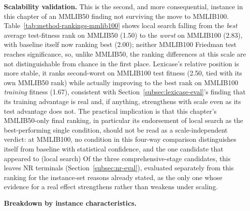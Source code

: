 \textbf{Scalability validation.} This is the second, and more consequential,
instance in this chapter of an MMLIB50 finding not surviving the move to
MMLIB100. Table~\ref{tab:method-rankings-mmlib100} shows local search
falling from the \emph{best} average test-fitness rank on MMLIB50 (1.50) to
the \emph{worst} on MMLIB100 (2.83), with baseline itself now ranking best
(2.00); neither MMLIB100 Friedman test reaches significance, so, unlike
MMLIB50, the ranking differences at this scale are not distinguishable from
chance in the first place. Lexicase's relative position is more stable, it
ranks second-worst on MMLIB100 test fitness (2.50, tied with its own
MMLIB50 rank) while actually improving to the best rank on MMLIB100
\emph{training} fitness (1.67), consistent with
Section~\ref{subsec:lexicase-eval}'s finding that its training advantage is
real and, if anything, strengthens with scale even as its test advantage
does not. The practical implication is that this chapter's MMLIB50-only
final ranking, in particular its endorsement of local search as the
best-performing single condition, should not be read as a scale-independent
verdict: at MMLIB100, no condition in this four-way comparison
distinguishes itself from baseline with statistical confidence, and the
one candidate that appeared to (local search) 
Of the three comprehensive-stage candidates, this leaves NR terminals
(Section~\ref{subsec:nr-eval}), evaluated separately from this ranking for
the instance-set reasons already stated, as the only one whose evidence for
a real effect strengthens rather than weakens under scaling.

\textbf{Breakdown by instance characteristics.}

